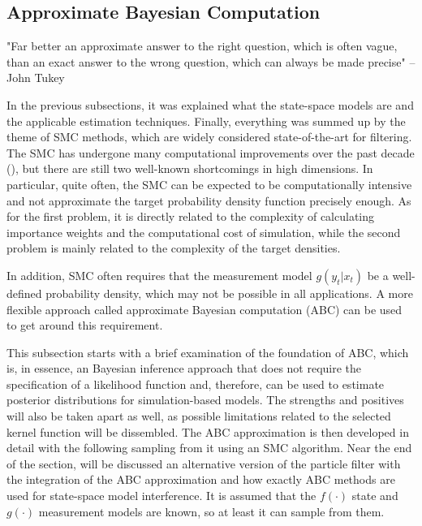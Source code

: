 

\subsection{Approximate Bayesian Computation}

\begin{displayquote}
"Far better an approximate answer to the right question, which is
often vague, than an exact answer to the wrong question, which can
always be made precise" – John Tukey
\end{displayquote}

In the previous subsections, it was explained what the state-space models are and the applicable estimation techniques. Finally, everything was summed up by the theme of SMC methods, which are widely considered state-of-the-art for filtering. The SMC has undergone many computational improvements over the past decade (\cite{Doucet2008ATO}), but there are still two well-known shortcomings in high dimensions. In particular, quite often, the SMC can be expected to be computationally intensive and not approximate the target probability density function precisely enough. As for the first problem, it is directly related to the complexity of calculating importance weights and the computational cost of simulation, while the second problem is mainly related to the complexity of the target densities. 

In addition, SMC often requires that the measurement model \(g\left(y_t | x_t\right)\) be a well-defined probability density, which may not be possible in all applications. A more flexible approach called approximate Bayesian computation (ABC) can be used to get around this requirement.

This subsection starts with a brief examination of the foundation of ABC, which is, in essence, an Bayesian inference approach that does not require the specification of a likelihood function and, therefore, can be used to estimate posterior distributions for simulation-based models. The strengths and positives will also be taken apart as well, as possible limitations related to the selected kernel function will be dissembled.
The ABC approximation is then developed in detail with the following sampling from it using an SMC algorithm. Near the end of the section, will be discussed an alternative version of the particle filter with the integration of the ABC approximation and how exactly ABC methods are used for state-space model interference. It is assumed that the \(f\left( \cdot \right)\) state and \(g\left( \cdot \right)\) measurement models are known, so at least it can sample from them.

